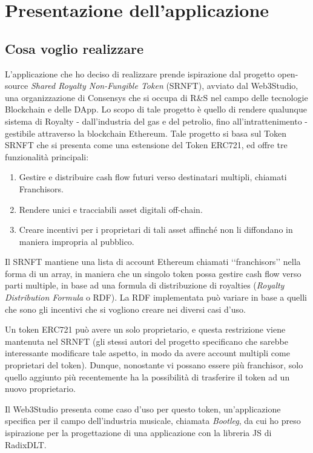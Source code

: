 \chapter{Presentazione dell'applicazione}

\section{Cosa voglio realizzare}
L'applicazione che ho deciso di realizzare prende ispirazione dal progetto open-source \textit{Shared Royalty Non-Fungible Token} (SRNFT), avviato dal Web3Studio, una organizzazione di Consensys che si occupa di R&S nel campo delle tecnologie Blockchain e delle DApp. Lo scopo di tale progetto è quello di rendere qualunque sistema di Royalty - dall'industria del gas e del petrolio, fino all'intrattenimento - gestibile attraverso la blockchain Ethereum. Tale progetto si basa sul Token SRNFT che si presenta come una estensione del Token ERC721, ed offre tre funzionalità principali:
\begin{enumerate}
    \item Gestire e distribuire cash flow futuri verso destinatari multipli, chiamati Franchisors.
    \item Rendere unici e tracciabili asset digitali off-chain.
    \item Creare incentivi per i proprietari di tali asset affinché non li diffondano in maniera impropria al pubblico.
\end{enumerate}
Il SRNFT mantiene una lista di account Ethereum chiamati ‘‘franchisors’’ nella forma di un array, in maniera che un singolo token possa gestire cash flow verso parti multiple, in base ad una formula di distribuzione di royalties (\textit{Royalty Distribution Formula} o RDF). La RDF implementata può variare in base a quelli che sono gli incentivi che si vogliono creare nei diversi casi d'uso. 

Un token ERC721 può avere un solo proprietario, e questa restrizione viene mantenuta nel SRNFT (gli stessi autori del progetto specificano che sarebbe interessante modificare tale aspetto, in modo da avere account multipli come proprietari del token). Dunque, nonostante vi possano essere più franchisor, solo quello aggiunto più recentemente ha la possibilità di trasferire il token ad un nuovo proprietario.

Il Web3Studio presenta come caso d'uso per questo token, un'applicazione specifica per il campo dell'industria musicale, chiamata \textit{Bootleg}, da cui ho preso ispirazione per la progettazione di una applicazione con la libreria JS di RadixDLT. 

